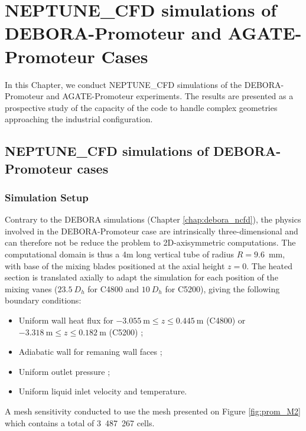 \chapter{NEPTUNE\_CFD simulations of DEBORA-Promoteur and AGATE-Promoteur Cases}
\label{chap:prom_ncfd}

\minitoc


In this Chapter, we conduct NEPTUNE\_CFD simulations of the DEBORA-Promoteur and AGATE-Promoteur experiments. The results are presented as a prospective study of the capacity of the code to handle complex geometries approaching the industrial configuration.


\section{NEPTUNE\_CFD simulations of DEBORA-Promoteur cases}
\label{sec:debprom_ncfd}

\subsection{Simulation Setup}

Contrary to the DEBORA simulations (Chapter \ref{chap:debora_ncfd}), the physics involved in the DEBORA-Promoteur case are intrinsically three-dimensional and can therefore not be reduce the problem to 2D-axisymmetric computations. The computational domain is thus a 4m long vertical tube of radius $R=9.6$\ mm, with base of the mixing blades positioned at the axial height $z=0$. The heated section is translated axially to adapt the simulation for each position of the mixing vanes ($23.5\ D_{h}$ for C4800 and $10\ D_{h}$ for C5200), giving the following boundary conditions:

\begin{itemize}
\item Uniform wall heat flux for $-3.055\ \textrm{m} \leq z \leq 0.445\ \textrm{m}$ (C4800) or $-3.318\ \textrm{m} \leq z \leq 0.182\ \textrm{m}$ (C5200) ;
\item Adiabatic wall for remaning wall faces ;
\item Uniform outlet pressure ;
\item Uniform liquid inlet velocity and temperature.
\end{itemize}


A mesh sensitivity conducted to use the mesh presented on Figure \ref{fig:prom_M2} which contains a total of 3~487~267 cells.

